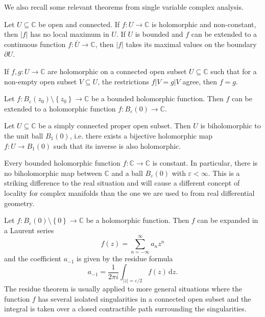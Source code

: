 We also recall some relevant theorems from single variable complex analysis.

\begin{proposition}\label{1.1.2}
	Let $U\subseteq \mathbb{C} $ be open and connected. If $f : U \to \mathbb{C} $ is holomorphic and non-constant, then $\left| f \right| $ has no local maximum in $U$. If $U$ is bounded and $f$ can be extended to a continuous function $f : \overline{U}  \to \mathbb{C} $, then $\left| f \right| $ takes its maximal values on the boundary $\partial U$.
\end{proposition}
\begin{proposition}\label{1.1.3}
	If $f,g : U \to \mathbb{C} $ are holomorphic on a connected open subset $U\subseteq \mathbb{C} $ such that for a non-empty open subset $V\subseteq U$, the restrictions $f|V=g|V$ agree, then $f=g$.
\end{proposition}
\begin{proposition}\label{1.1.4}
	Let $f : B_\varepsilon (z_0)\setminus \left\{ z_0 \right\}  \to \mathbb{C} $ be a bounded holomorphic function. Then $f$ can be extended to a holomorphic function $f : B_\varepsilon (0) \to \mathbb{C} $.
\end{proposition}
\begin{proposition}\label{1.1.5}
	Let $U\subseteq \mathbb{C} $ be a simply connected proper open subset. Then $U$ is biholomorphic to the unit ball $B_1(0)$, i.e. there exists a bijective holomorphic map $f : U \to B_1(0)$ such that its inverse is also holomorphic.
\end{proposition}
\begin{proposition}[Liouville]\label{1.1.6}
	Every bounded holomorphic function $f : \mathbb{C}  \to \mathbb{C} $ is constant. In particular, there is no biholomorphic map between $\mathbb{C} $ and a ball $B_\varepsilon (0)$ with $\varepsilon <\infty $. This is a striking difference to the real situation and will cause a different concept of locality for complex manifolds than the one we are used to from real differential geometry.
\end{proposition}
\begin{proposition}\label{1.1.7}
	Let $f : B_\varepsilon (0)\setminus \left\{ 0 \right\}  \to \mathbb{C} $ be a holomorphic function. Then $f$ can be expanded in a Laurent series
	\[
		f(z)=\sum_{n=-\infty }^{\infty} a_nz^n
	\]
	and the coefficient $a_{-1} $ is given by the residue formula
	\[
		a_{-1} =\frac{1}{2\pi i} \int_{\left| z \right| =\varepsilon /2} f(z) \,\mathrm{d} z
	.\]
	The residue theorem is usually applied to more general situations where the function $f$ has several isolated singularities in a connected open subset and the integral is taken over a closed contractible path surrounding the singularities.
\end{proposition}



